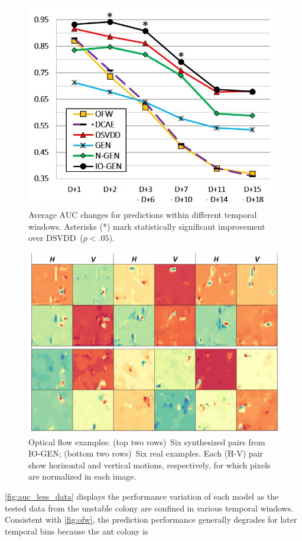 \documentclass[letterpaper]{article} %
\let\orgautoref\autoref
\providecommand{\Autoref}
{\def\equationautorefname{Equation}%
\def\figureautorefname{Figure}%
\def\subfigureautorefname{Figure}%
\def\Itemautorefname{Item}%
\def\tableautorefname{Table}%
\def\exerciseautorefname{Exercise}%
\def\starexerciseautorefname{Exercise}%
\def\sectionautorefname{Section}%
\def\subsectionautorefname{Section}%
\def\subsubsectionautorefname{Section}%
\def\chapterautorefname{Section}%
\def\partautorefname{Part}%
\orgautoref}
\renewcommand{\autoref}
{\def\equationautorefname{Equation}%
\def\figureautorefname{Fig.}%
\def\subfigureautorefname{Fig.}%
\def\Itemautorefname{item}%
\def\tableautorefname{Table}%
\def\exerciseautorefname{Exercise}%
\def\starexerciseautorefname{Exercise}%
\def\sectionautorefname{Section}%
\def\subsectionautorefname{Section}%
\def\subsubsectionautorefname{Section}%
\def\chapterautorefname{Section}%
\def\partautorefname{Part}%
\orgautoref}
\begin{document}
\begin{figure}[t]
\centering
\includegraphics[width=.75\columnwidth]{auc_less_data}
\caption{
Average AUC changes for predictions within different temporal
windows.
Asterisks (*) mark statistically significant improvement over
DSVDD~($p<.05$).
}
\label{fig:auc_less_data}
\end{figure}
\vspace{-2.96mm}
\begin{figure}\centering
\includegraphics[width=.75\linewidth]{real_fake_flows}
\caption{Optical flow examples:
(top two rows)~Six synthesized pairs from \mbox{IO-GEN};
(bottom two rows)~Six real examples.
Each (H-V) pair show horizontal and vertical motions,
respectively, for which pixels are normalized in each image.
}
\label{fig:real_fake_flows}
\end{figure}
\Autoref{fig:auc_less_data} displays the performance variation of each
model as the tested data from the unstable colony are confined in
various temporal windows.
Consistent with \autoref{fig:ofw}, the prediction performance
generally degrades for later temporal bins because the ant colony is
\end{document}
